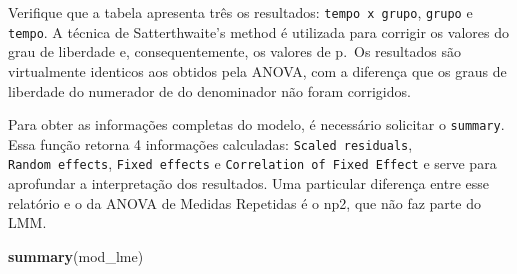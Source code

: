 \documentclass[
]{book}
\newenvironment{Shaded}{\begin{snugshade}}{\end{snugshade}}
\newcommand{\KeywordTok}[1]{\textcolor[rgb]{0.13,0.29,0.53}{\textbf{#1}}}
\newcommand{\NormalTok}[1]{#1}
\begin{document}
Verifique que a tabela apresenta três os resultados:
\texttt{tempo\ x\ grupo}, \texttt{grupo} e \texttt{tempo}. A técnica de
Satterthwaite's method é utilizada para corrigir os valores do grau de
liberdade e, consequentemente, os valores de p.~Os resultados são
virtualmente identicos aos obtidos pela ANOVA, com a diferença que os
graus de liberdade do numerador de do denominador não foram corrigidos.

Para obter as informações completas do modelo, é necessário solicitar o
\texttt{summary}. Essa função retorna 4 informações calculadas:
\texttt{Scaled\ residuals}, \texttt{Random\ effects},
\texttt{Fixed\ effects} e \texttt{Correlation\ of\ Fixed\ Effect} e
serve para aprofundar a interpretação dos resultados. Uma particular
diferença entre esse relatório e o da ANOVA de Medidas Repetidas é o
np2, que não faz parte do LMM.

\begin{Shaded}
\begin{Highlighting}[]
\KeywordTok{summary}\NormalTok{(mod_lme) }
\end{Highlighting}
\end{Shaded}
\end{document}
